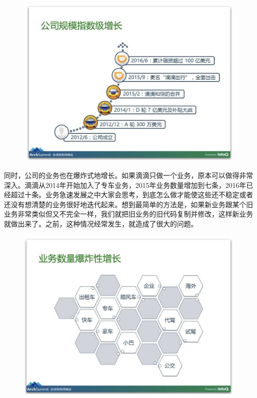 \documentclass[12pt]{article}
\begin{document}
\begin{figure}[H]
    \centering
    \includegraphics[width=1\textwidth]{fig/DIDI_Reconstruction_1.png}
\end{figure}

同时，公司的业务也在爆炸式地增长。如果滴滴只做一个业务，原本可以做得非常深入。滴滴从2014年开始加入了专车业务，2015年业务数量增加到七条，2016年已经超过十条。业务急速发展之中大家会思考，到底怎么做才能使这些还不稳定或者还没有想清楚的业务很好地迭代起来。想到最简单的方法是，如果新业务跟某个旧业务非常类似但又不完全一样，我们就把旧业务的旧代码复制并修改，这样新业务就做出来了。之前，这种情况经常发生，就造成了很大的问题。

\begin{figure}[H]
    \centering
    \includegraphics[width=1\textwidth]{fig/DIDI_Reconstruction_2.png}
\end{figure}
\end{document}
